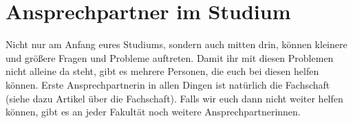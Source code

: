 \section{Ansprechpartner im Studium}

Nicht nur am Anfang eures Studiums, sondern auch mitten drin, können kleinere und größere Fragen und Probleme auftreten. Damit ihr mit diesen Problemen nicht alleine da steht, gibt es mehrere Personen, die euch bei diesen helfen können. Erste Ansprechpartnerin in allen Dingen ist natürlich die Fachschaft (siehe dazu Artikel über die Fachschaft). Falls wir euch dann nicht weiter helfen können, gibt es an jeder Fakultät noch weitere Ansprechpartnerinnen.

\newcommand{\proffoto}[2]{
    \centering
    \texttt{[image: \#1]}\\
    #2
    \vspace{4mm}
}

